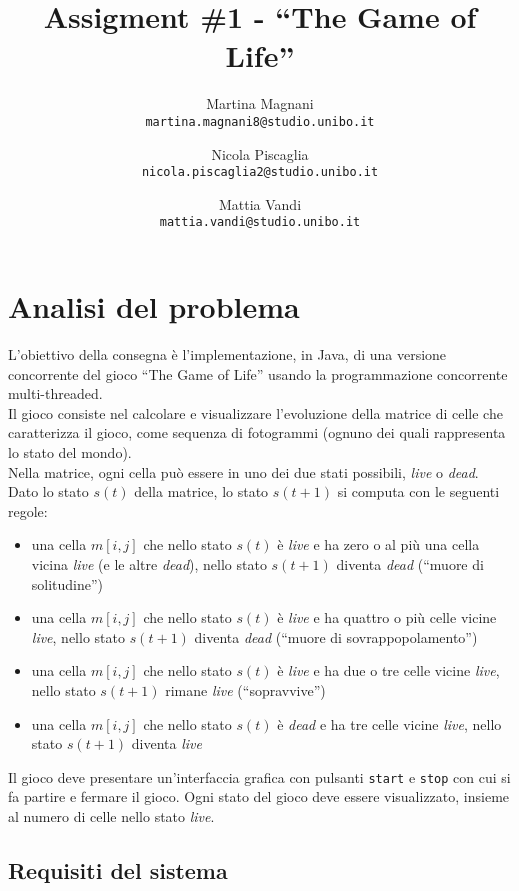 ﻿\documentclass[a4paper]{article}
\title{\LARGE \bf
Assigment \#1 - ``The Game of Life''
}
\author{
    Martina Magnani\\
    \texttt{martina.magnani8@studio.unibo.it}
    \and
    Nicola Piscaglia\\
    \texttt{nicola.piscaglia2@studio.unibo.it}
    \and
    Mattia Vandi\\
    \texttt{mattia.vandi@studio.unibo.it}
}
\date{}
\begin{document}
\maketitle
\section{Analisi del problema}\label{analisi-del-problema}

L'obiettivo della consegna è l'implementazione, in Java, di una versione concorrente del gioco ``The Game of Life'' usando la programmazione concorrente multi-threaded.\\
Il gioco consiste nel calcolare e visualizzare l'evoluzione della
matrice di celle che caratterizza il gioco, come sequenza di fotogrammi (ognuno dei quali rappresenta lo stato del mondo).\\
Nella matrice, ogni cella può essere in uno dei due stati possibili, \emph{live} o \emph{dead}.\\
Dato lo stato \(s\left(t\right)\) della matrice, lo stato \(s\left(t + 1\right)\) si computa con le seguenti regole:

\begin{itemize}
\item
  una cella \(m\left[i,j\right]\) che nello stato \(s\left(t\right)\) è \emph{live} e ha zero o al più una cella vicina \emph{live} (e le altre \emph{dead}), nello stato \(s\left(t + 1\right)\) diventa \emph{dead} (``muore di solitudine'')
\item
  una cella \(m\left[i,j\right]\) che nello stato \(s\left(t\right)\) è \emph{live} e ha quattro o più celle vicine \emph{live}, nello stato \(s\left(t + 1\right)\) diventa \emph{dead} (``muore di sovrappopolamento'')
\item
  una cella \(m\left[i,j\right]\) che nello stato \(s\left(t\right)\) è \emph{live} e ha due o tre celle vicine \emph{live}, nello stato \(s\left(t + 1\right)\) rimane \emph{live} (``sopravvive'')
\item
  una cella \(m\left[i,j\right]\) che nello stato \(s\left(t\right)\) è \emph{dead} e ha tre celle vicine \emph{live}, nello stato \(s\left(t + 1\right)\) diventa \emph{live}
\end{itemize}
Il gioco deve presentare un'interfaccia grafica con pulsanti \texttt{start} e \texttt{stop} con cui si fa partire e fermare il gioco.
Ogni stato del gioco deve essere visualizzato, insieme al numero di celle nello stato \emph{live}.

\subsection{Requisiti del sistema}\label{requisiti-del-sistema}
\end{document}
